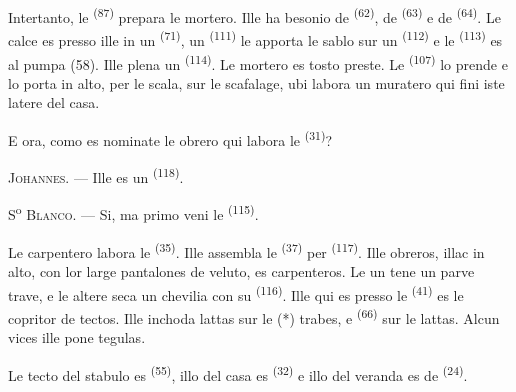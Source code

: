 Intertanto, le  \textsuperscript{(87)} prepara le mortero.
Ille ha besonio de  \textsuperscript{(62)}, de 
\textsuperscript{(63)} e de  \textsuperscript{(64)}. Le calce es
presso ille in un  \textsuperscript{(71)}, un  \textsuperscript{(111)} le apporta le sablo sur un  \textsuperscript{(112)} e le 
\textsuperscript{(113)} es al pumpa (58). Ille plena un 
\textsuperscript{(114)}. Le mortero es tosto preste. Le  \textsuperscript{(107)} lo prende e lo porta in alto, per le scala, sur
le scafalage, ubi labora un muratero qui fini iste latere del casa.

E ora, como es nominate le obrero qui labora le 
\textsuperscript{(31)}?

\textsc{Johannes}. --- Ille es un 
\textsuperscript{(118)}.

\VUsaut{3.0mm}
\VUsaut{3.0mm}

S\textsuperscript{o} \textsc{Blanco}. --- Si, ma primo veni le 
\textsuperscript{(115)}.

Le carpentero labora le  \textsuperscript{(35)}. Ille
assembla le  \textsuperscript{(37)} per 
\textsuperscript{(117)}. Ille obreros, illac in alto, con lor large pantalones
de veluto, es carpenteros. Le un tene un parve trave, e le altere seca un
chevilia con su  \textsuperscript{(116)}. Ille qui es presso le
 \textsuperscript{(41)} es le copritor de tectos. Ille inchoda
lattas sur le (*) trabes, e  \textsuperscript{(66)} sur le
lattas. Alcun vices ille pone tegulas.


Le tecto del stabulo es  \textsuperscript{(55)},
illo del casa es  \textsuperscript{(32)} e illo del
veranda es de  \textsuperscript{(24)}.

